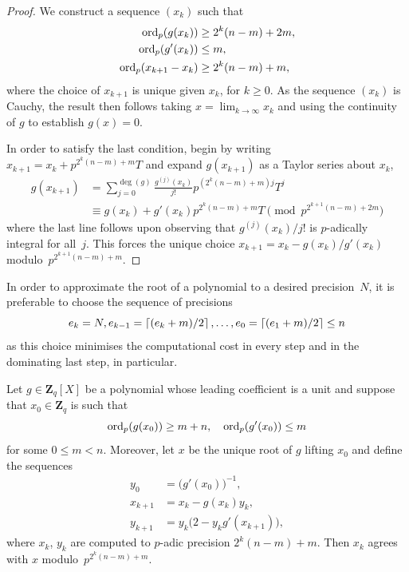 \begin{proof}
We construct a sequence $(x_k)$ such that 
\begin{align*}
\operatorname{ord}_p(g(x_k)) & \geq 2^k (n - m) + 2m, \\
\operatorname{ord}_p(g'(x_k)) & \leq m, \\
\operatorname{ord}_p(x_{k+1} - x_k) & \geq 2^k (n-m) + m, 
\end{align*}
where the choice of $x_{k+1}$ is unique given $x_k$, for $k \geq 0$.  
As the sequence $(x_k)$ is Cauchy, the result then follows taking 
$x = \lim_{k \to \infty} x_k$ and using the continuity of $g$ to 
establish $g(x) = 0$.

In order to satisfy the last condition, begin by writing 
$x_{k+1} = x_k + p^{2^k(n-m) + m} T$ and expand $g(x_{k+1})$ 
as a Taylor series about $x_k$, 
\begin{align*}
g(x_{k+1}) & = \sum_{j=0}^{\deg(g)} \frac{g^{(j)}(x_k)}{j!} p^{(2^k(n-m) + m) j} T^j \\
           & \equiv g(x_k) + g'(x_k) p^{2^k(n-m) + m} T \pmod{p^{2^{k+1}(n-m)+2m}}
\end{align*}
where the last line follows upon observing that $g^{(j)}(x_k) / j!$ 
is $p$-adically integral for all~$j$.  This forces the unique choice 
$x_{k+1} = x_k - g(x_k) / g'(x_k)$ modulo~${p^{2^{k+1}(n-m) + m}}$.
\end{proof}

\begin{rem}
In order to approximate the root of a polynomial to a desired 
precision~$N$, it is preferable to choose the sequence of 
precisions 
\begin{equation*}
e_{k} = N, e_{k-1} = \left\lceil(e_k + m) / 2\right\rceil, \dotsc, 
e_0 = \left\lceil(e_1 + m) / 2\right\rceil \leq n
\end{equation*}
as this choice minimises the computational cost in every step 
and in the dominating last step, in particular.
\end{rem}

\begin{thm} \label{thm:Hensel2}
Let $g \in \mathbf{Z}_q[X]$ be a polynomial whose leading coefficient 
is a unit and suppose that $x_0 \in \mathbf{Z}_q$ is such that 
\begin{equation*}
\operatorname{ord}_p(g(x_0)) \geq m + n, \quad \operatorname{ord}_p(g'(x_0)) \leq m
\end{equation*}
for some $0 \leq m < n$.  Moreover, let $x$ be the unique root of $g$ 
lifting $x_0$ and define the sequences
\begin{align*}
y_0 & = \bigl( g'(x_0) \bigr)^{-1}, \\
x_{k+1} & = x_k - g(x_k) y_k, \\
y_{k+1} & = y_k \bigl( 2 - y_k g'(x_{k+1}) \bigr),
\end{align*}
where $x_k$, $y_k$ are computed to $p$-adic precision $2^k (n-m) + m$.
Then $x_k$ agrees with $x$ modulo~$p^{2^k (n - m) + m}$.
\end{thm}

